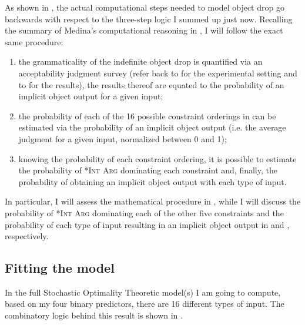 As shown in , the actual computational steps needed to model object drop go backwards with respect to the three-step logic I summed up just now. Recalling the summary of Medina's computational reasoning in , I will follow the exact same procedure:
\begin{enumerate}
    \item the grammaticality of the indefinite object drop is quantified via an acceptability judgment survey (refer back to  for the experimental setting and to  for the results), the results thereof are equated to the probability of an implicit object output for a given input;
    \item the probability of each of the 16 possible constraint orderings in  can be estimated via the probability of an implicit object output (i.e. the average judgment for a given input, normalized between 0 and 1);
    \item knowing the probability of each constraint ordering, it is possible to estimate the probability of \textsc{*Int Arg} dominating each constraint and, finally, the probability of obtaining an implicit object output with each type of input.
\end{enumerate}

In particular, I will assess the mathematical procedure in , while I will discuss the probability of \textsc{*Int Arg} dominating each of the other five constraints and the probability of each type of input resulting in an implicit object output in  and , respectively.


\subsection{Fitting the model} 

In the full Stochastic Optimality Theoretic model(s) I am going to compute, based on my four binary predictors, there are 16 different types of input. The combinatory logic behind this result is shown in .

